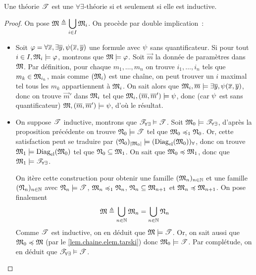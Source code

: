 \begin{theorem}
  Une théorie $\mathscr T$ est une $\forall\exists$-théorie si et seulement si elle
  est inductive.
\end{theorem}

\begin{proof}
  On pose $\mathfrak{M}\triangleq\displaystyle\bigcup_{i \in I}\mathfrak{M}_i$.
  On procède par double implication~:
  \begin{itemize}
  \item[\fbox{$\Rightarrow$}]
    Soit $\varphi = \forall \overline{x},\exists \overline{y},\psi(\overline{x},\overline{y})$ une
    formule avec $\psi$ sans quantificateur. Si pour tout
    $i\in I, \mathfrak{M}_i\models\varphi$, montrons que $\mathfrak{M}\models\varphi$.
    Soit $\vec m$ la donnée de paramètres dans $\mathfrak{M}$. Par définition,
    pour chaque $m_1,\ldots,m_n$ on trouve $i_1,\ldots,i_n$ tels que
    $m_k\in\mathfrak{M}_{i_k}$, mais comme $(\mathfrak{M}_i)$ est une chaîne, on peut
    trouver un $i$ maximal tel tous les $m_k$ appartiennent à $\mathfrak{M}_i$.
    On sait alors que
    $\mathfrak{M}_i,\overline{m}\models\exists \overline{y},\psi(\overline{x},\overline{y})$, donc
    on trouve $\vec{m}'$ dans $\mathfrak{M}_i$ tel que
    $\mathfrak{M}_i,(\overline{m},\overline{m}')\models\psi$, donc (car $\psi$ est sans
    quantificateur) $\mathfrak{M},(\overline{m},\overline{m}')\models\psi$, d'où le résultat.
  \item[\fbox{$\Leftarrow$}]
    On suppose $\mathscr T$ inductive, montrons que $\mathscr T_{\forall\exists}\vDash\mathscr T$.
    Soit $\mathfrak{M}_0\models\mathscr T_{\forall\exists}$, d'après la proposition
    précédente on trouve $\mathfrak{N}_0\models\mathscr T$ tel que
    $\mathfrak{M}_0\preccurlyeq_{1}\mathfrak{N}_0$. Or, cette satisfaction peut se traduire par
    $(\mathfrak{N}_0)_{\left\vert \mathfrak{M}_0\right\vert}\models(\operatorname{Diag}_{\mathrm{el}}(\mathfrak{M}_0))_{\forall}$,
    donc on trouve $\mathfrak{M}_1\models\operatorname{Diag}_{\mathrm{el}}(\mathfrak{M}_0)$ tel que
    $\mathfrak{N}_0\subseteq\mathfrak{M}_1$. On sait que $\mathfrak{M}_0\preccurlyeq\mathfrak{M}_1$,
    donc que $\mathfrak{M}_1\models\mathscr T_{\forall\exists}$.

    On itère cette construction pour obtenir une famille
    $(\mathfrak{M}_n)_{n \in \mathbb N}$ et une famille $(\mathfrak{N}_n)_{n\in\mathbb N}$ avec
    $\mathfrak{N}_n\models\mathscr T$, $\mathfrak{M}_n\preccurlyeq_{1}\mathfrak{N}_n$,
    $\mathfrak{N}_n\subseteq\mathfrak{M}_{n+1}$ et $\mathfrak{M}_n\preccurlyeq\mathfrak{M}_{n+1}$. On pose
    finalement
    \[\mathfrak{M}\triangleq \bigcup_{n \in \mathbb N}\mathfrak{M}_n = \bigcup_{n \in \mathbb N} \mathfrak{N}_n\]
    Comme $\mathscr T$ est inductive, on en déduit que $\mathfrak{M}\models\mathscr T$. Or,
    on sait aussi que $\mathfrak{M}_0\preccurlyeq\mathfrak{M}$ (par le
    \cref{lem.chaine.elem.tarski}) donc $\mathfrak{M}_0\models\mathscr T$. Par complétude,
    on en déduit que $\mathscr T_{\forall\exists}\vDash\mathscr T$.\qedhere
  \end{itemize}
\end{proof}

